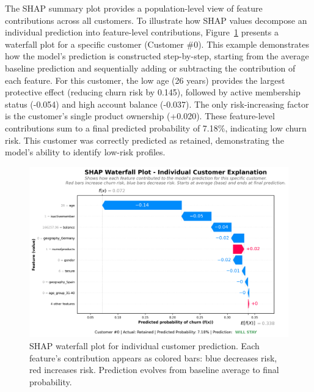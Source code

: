 \documentclass[12pt]{article}
\begin{document}
The SHAP summary plot provides a population-level view of feature contributions across all customers. To illustrate how SHAP values decompose an individual prediction into feature-level contributions, Figure~\ref{fig:shap_waterfall} presents a waterfall plot for a specific customer (Customer \#0). This example demonstrates how the model's prediction is constructed step-by-step, starting from the average baseline prediction and sequentially adding or subtracting the contribution of each feature. For this customer, the low age (26 years) provides the largest protective effect (reducing churn risk by 0.145), followed by active membership status (-0.054) and high account balance (-0.037). The only risk-increasing factor is the customer's single product ownership (+0.020). These feature-level contributions sum to a final predicted probability of 7.18\%, indicating low churn risk. This customer was correctly predicted as retained, demonstrating the model's ability to identify low-risk profiles.

\begin{figure}[H]
\centering
\includegraphics[width=\textwidth]{img/26_shap_waterfall.png}
\caption{SHAP waterfall plot for individual customer prediction. Each feature's contribution appears as colored bars: blue decreases risk, red increases risk. Prediction evolves from baseline average to final probability.}
\label{fig:shap_waterfall}
\end{figure}
\end{document}
